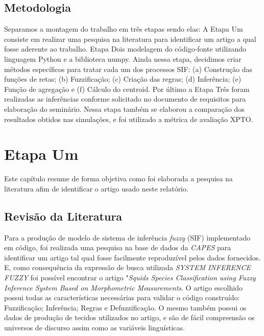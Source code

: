 \documentclass[courier]{uninove-ppgi}
\begin{document}
        
  
    
    \section{Metodologia}
    
		Separamos a montagem do trabalho em três etapas sendo elas: A Etapa Um consiste em realizar uma pesquisa na literatura para identificar um artigo a qual fosse aderente ao trabalho.
		Etapa Dois modelagem do código-fonte utilizando linguagem Python e a biblioteca numpy. Ainda nessa etapa, decidimos criar métodos específicos para tratar cada um dos processos SIF:
		(a) Construção das funções de retas; (b) Fuzzificação; (c) Criação das regras; (d) Inferência; (e) Função de agregação e (f) Cálculo do centroid.
		Por último a Etapa Três foram realizadas as inferências conforme solicitado no documento de requisitos para elaboração do seminário. Nessa etapa também se elaborou a comparação dos resultados obtidos nas simulações, 
		e foi utilizado a métrica de avaliação XPTO.
    
     \chapter{Etapa Um}
    
        \begin{resumocapitulo}
            Este capítulo resume de forma objetiva como foi elaborada a pesquisa na literatura afim de identificar o artigo usado neste relatório. 
        \end{resumocapitulo}
		
		\section{Revisão da Literatura}
		
		Para a produção de modelo de sistema de inferência \textit{fuzzy} (SIF) implementado em código, foi realizada uma pesquisa na base de dados da \textit{CAPES} 
		para identificar um artigo tal qual fosse facilmente reproduzível pelos dados fornecidos. E, como consequência da expressão de busca utilizada \textit{SYSTEM INFERENCE FUZZY} 
		foi possível encontrar o artigo "\textit{Squids Species Classification using Fuzzy Inference System Based on Morphometric Measurements}.
		O artigo escolhido possui todas as características necessárias para validar o código construído: Fuzzificação; Inferência; Regras e Defuzzificação.
		O mesmo também possui os dados de produção de tecidos utilizados no artigo, e são de fácil compreensão os universos de discurso assim como as variáveis linguísticas.
    
\end{document}
